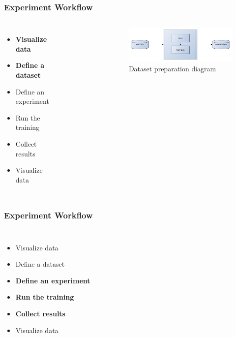 \documentclass[aspectratio=169,11pt,hyperref={colorlinks=true}]{beamer}
\begin{document}
\begin{frame}
    \frametitle{Experiment Workflow}
    \begin{columns}
        \begin{itemize}
            \item{\textbf{Visualize data}}
            \item{\textbf{Define a dataset}}
            \item{Define an experiment}
            \item{Run the training}
            \item{Collect results}
            \item{Visualize data}
        \end{itemize}
          \begin{figure}
            
          \end{figure}
          \begin{figure}
            \includegraphics[width=1\textwidth]{diagrams/build-dataset.png}
            \caption{Dataset preparation diagram}
          \end{figure}
    \end{columns}
\end{frame}

\begin{frame}
    \frametitle{Experiment Workflow}
    \begin{columns}
        \begin{itemize}
            \item{Visualize data}
            \item{Define a dataset}
            \item{\textbf{Define an experiment}}
            \item{\textbf{Run the training}}
            \item{\textbf{Collect results}}
            \item{Visualize data}
        \end{itemize}
          \begin{figure}
            
          \end{figure}
          \begin{figure}
            
          \end{figure}
    \end{columns}
\end{frame}
\end{document}
